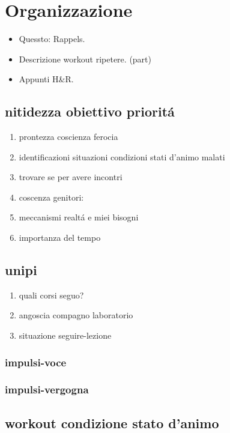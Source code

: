 {\let\clearpage\relax
\chapter{Organizzazione}
}

\begin{itemize}
\item Quessto: Rappels.
\item Descrizione workout ripetere.
 (part)
\item Appunti H\&R.
\end{itemize}


\section{nitidezza obiettivo priorit\'a}

\begin{enumerate}
\item prontezza coscienza ferocia
\item identificazioni situazioni condizioni stati d'animo malati
\item trovare se per avere incontri
\item coscenza genitori:
\item meccanismi realt\'a e miei bisogni
\item importanza del tempo
\end{enumerate}

\section{unipi}

\begin{enumerate}
\item quali corsi seguo?
\item angoscia compagno laboratorio
\item situazione seguire-lezione
\end{enumerate}

\subsection{impulsi-voce}

\subsection{impulsi-vergogna}


\section{workout condizione stato d'animo}

